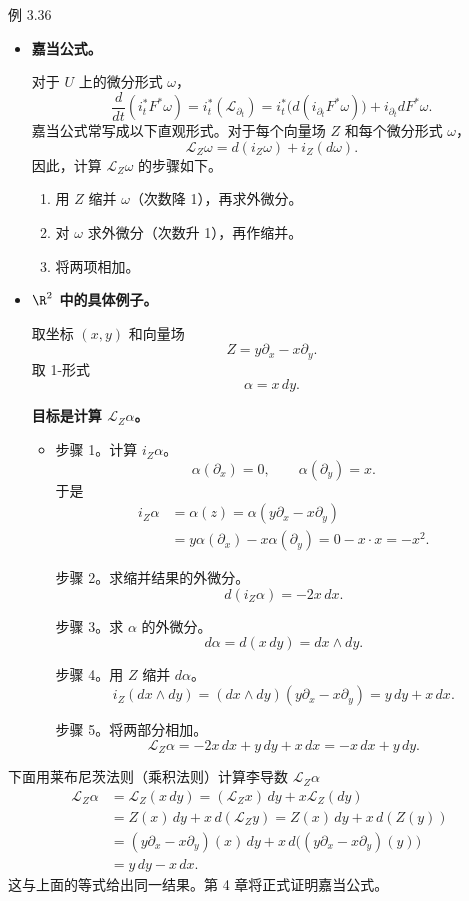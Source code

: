 \begin{statement}{例 3.36}{}
\begin{itemize}
\item \textbf{嘉当公式。}

对于 $U$ 上的微分形式 $\omega$，%
%
\[
 \frac{d}{dt}(i_t^*F^*\omega)
   =i_t^*(\mathcal L_{\partial_t})
   =i_t^*\bigl(d(i_{\partial_t}F^*\omega)\bigr)+i_{\partial_t}dF^*\omega.
\]
嘉当公式常写成以下直观形式。对于每个向量场 $Z$ 和每个微分形式 $\omega$，
\begin{equation*}
  \mathcal L_Z\omega=d(i_Z\omega)+i_Z(d\omega).
  \tag{3.8}\label{eq:3.8}
\end{equation*}
因此，计算 $\mathcal L_Z\omega$ 的步骤如下。
\begin{enumerate}
\item 用 $Z$ 缩并 $\omega$（次数降 1），再求外微分。
\item 对 $\omega$ 求外微分（次数升 1），再作缩并。
\item 将两项相加。
\end{enumerate}
\item \textbf{$\R^2$ 中的具体例子。}

取坐标 $(x,y)$ 和向量场
\[
  Z=y\partial_x-x\partial_y.
\]
取 1-形式
\[
  \alpha=x\,dy.
\]

\noindent\textbf{目标是计算 $\mathcal L_Z\alpha$。}

\begin{itemize}
\item 步骤 1。计算 $i_Z\alpha$。
\[
  \alpha(\partial_x)=0,\qquad \alpha(\partial_y)=x.
\]
于是
\begin{align*}
  i_Z\alpha&=\alpha(z)=\alpha(y\partial_x-x\partial_y)\\
  &=y\alpha(\partial_x)-x\alpha(\partial_y)=0-x\cdot x=-x^2.
\end{align*}

步骤 2。求缩并结果的外微分。
\[
  d(i_Z\alpha)=-2x\,dx.
\]

步骤 3。求 $\alpha$ 的外微分。
\[
  d\alpha=d(x\,dy)=dx\wedge dy.
\]

步骤 4。用 $Z$ 缩并 $d\alpha$。
\[
  i_Z(dx\wedge dy)=(dx\wedge dy)(y\partial_x-x\partial_y)=y\,dy+x\,dx.
\]

步骤 5。将两部分相加。
\[
  \mathcal L_Z\alpha=-2x\,dx+y\,dy+x\,dx=-x\,dx+y\,dy.
\]
\end{itemize}
\end{itemize}
下面用莱布尼茨法则（乘积法则）计算李导数 $\mathcal L_Z\alpha$
\begin{align*}
  \mathcal L_Z\alpha
   &=\mathcal L_Z(x\,dy)=(\mathcal L_Z x)\,dy+x\mathcal L_Z(dy)\\
   &=Z(x)\,dy+x\,d(\mathcal L_Z y)=Z(x)\,dy+x\,d(Z(y))\\
   &=(y\partial_x-x\partial_y)(x)\,dy+x\,d\bigl((y\partial_x-x\partial_y)(y)\bigr)\\
   &=y\,dy-x\,dx.
\end{align*}
这与上面的等式给出同一结果。第 4 章将正式证明嘉当公式。


\end{statement}
